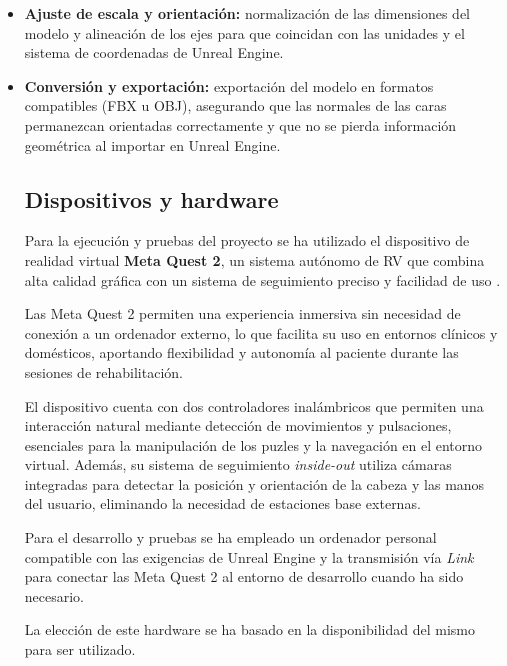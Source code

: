 \begin{itemize}
  \item \textbf{Ajuste de escala y orientación:} normalización de las dimensiones del modelo y alineación de los ejes para que coincidan con las unidades y el sistema de coordenadas de Unreal Engine.
  \item \textbf{Conversión y exportación:} exportación del modelo en formatos compatibles (FBX u OBJ), asegurando que las normales de las caras permanezcan orientadas correctamente y que no se pierda información geométrica al importar en Unreal Engine.

\subsection{Dispositivos y hardware}

Para la ejecución y pruebas del proyecto se ha utilizado el dispositivo de realidad virtual \textbf{Meta Quest 2}, un sistema autónomo de RV que combina alta calidad gráfica con un sistema de seguimiento preciso y facilidad de uso \cite{pimenta2022meta}.

Las Meta Quest 2 permiten una experiencia inmersiva sin necesidad de conexión a un ordenador externo, lo que facilita su uso en entornos clínicos y domésticos, aportando flexibilidad y autonomía al paciente durante las sesiones de rehabilitación.

El dispositivo cuenta con dos controladores inalámbricos que permiten una interacción natural mediante detección de movimientos y pulsaciones, esenciales para la manipulación de los puzles y la navegación en el entorno virtual. Además, su sistema de seguimiento \textit{inside-out} utiliza cámaras integradas para detectar la posición y orientación de la cabeza y las manos del usuario, eliminando la necesidad de estaciones base externas.

Para el desarrollo y pruebas se ha empleado un ordenador personal compatible con las exigencias de Unreal Engine y la transmisión vía \textit{Link} para conectar las Meta Quest 2 al entorno de desarrollo cuando ha sido necesario.

La elección de este hardware se ha basado en la disponibilidad del mismo para ser utilizado.
  
\end{itemize}